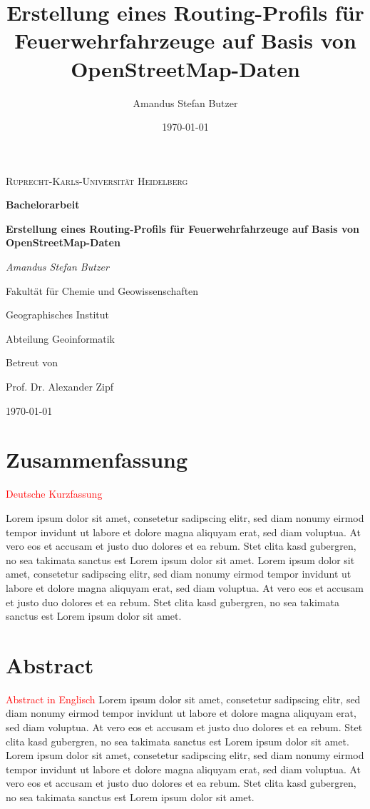 \documentclass[12pt,a4paper]{article}
\author{Amandus Stefan Butzer}
\title{Erstellung eines Routing-Profils für Feuerwehrfahrzeuge auf Basis von OpenStreetMap-Daten}
\date{\today}
\newcommand\todo[1]{\textcolor{red}{#1}}
\begin{document}
\begin{titlepage}
\begin{center}

	{\scshape\LARGE Ruprecht-Karls-Universität Heidelberg\par}
	\vspace{1.5cm}
	{\LARGE\bfseries Bachelorarbeit\par}
	\vspace{2cm}
	{\Huge\bfseries Erstellung eines Routing-Profils für Feuerwehrfahrzeuge auf Basis von OpenStreetMap-Daten\par}
	\vspace{2cm}
	{\Large\itshape Amandus Stefan Butzer\par}
	\vspace{2cm}
	{\large Fakultät für Chemie und Geowissenschaften \par Geographisches Institut \par Abteilung Geoinformatik\par}
	\vfill
	{Betreut von\par Prof. Dr. Alexander Zipf}

	\vfill

	{\large \today\par}
\end{center}
\end{titlepage}

\newpage

{\centering\section*{Zusammenfassung}}
\todo{Deutsche Kurzfassung}\par
Lorem ipsum dolor sit amet, consetetur sadipscing elitr, sed diam nonumy eirmod tempor invidunt ut labore et dolore magna aliquyam erat, sed diam voluptua. At vero eos et accusam et justo duo dolores et ea rebum. Stet clita kasd gubergren, no sea takimata sanctus est Lorem ipsum dolor sit amet. Lorem ipsum dolor sit amet, consetetur sadipscing elitr, sed diam nonumy eirmod tempor invidunt ut labore et dolore magna aliquyam erat, sed diam voluptua. At vero eos et accusam et justo duo dolores et ea rebum. Stet clita kasd gubergren, no sea takimata sanctus est Lorem ipsum dolor sit amet.

\newpage
{\centering\section*{Abstract}}
\todo{Abstract in Englisch}
Lorem ipsum dolor sit amet, consetetur sadipscing elitr, sed diam nonumy eirmod tempor invidunt ut labore et dolore magna aliquyam erat, sed diam voluptua. At vero eos et accusam et justo duo dolores et ea rebum. Stet clita kasd gubergren, no sea takimata sanctus est Lorem ipsum dolor sit amet. Lorem ipsum dolor sit amet, consetetur sadipscing elitr, sed diam nonumy eirmod tempor invidunt ut labore et dolore magna aliquyam erat, sed diam voluptua. At vero eos et accusam et justo duo dolores et ea rebum. Stet clita kasd gubergren, no sea takimata sanctus est Lorem ipsum dolor sit amet.
\end{document}
